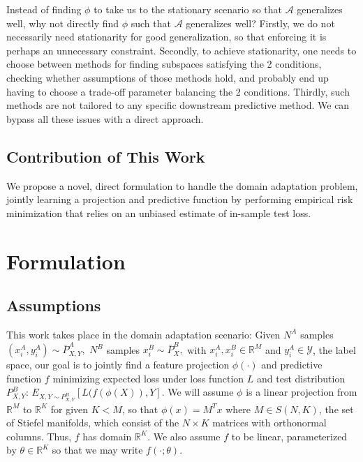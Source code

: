\documentclass[8pt]{article}
\begin{document}
Instead of finding $\phi$ to take us to the stationary scenario so that $\mathcal{A}$ generalizes well, why not directly find $\phi$ such that $\mathcal{A}$ generalizes well?  Firstly, we do not necessarily need stationarity for good generalization, so that enforcing it is perhaps an unnecessary constraint.  Secondly, to achieve stationarity, one needs to choose between methods for finding subspaces satisfying the 2 conditions, checking whether assumptions of those methods hold, and probably end up having to choose a trade-off parameter balancing the 2 conditions.  Thirdly, such methods are not tailored to any specific downstream predictive method.  We can bypass all these issues with a direct approach.%

\subsection{Contribution of This Work}
We propose a novel, direct formulation to handle the domain adaptation problem, jointly learning a projection and predictive function by performing empirical risk minimization that relies on an unbiased estimate of in-sample test loss.

\section{Formulation}
\subsection{Assumptions}
This work takes place in the domain adaptation scenario: Given $N^A$ samples $(x_i^A,y_i^A) \sim \bar{P}^A_{X,Y},$ $N^B$ samples $x_i^B \sim \bar{P}^B_{X},$ with $x_i^A,x_i^B \in \mathbb{R}^M$ and $y_i^A \in \mathcal{Y}$, the label space, our goal is to jointly find a feature projection $\phi(\cdot)$ and predictive function $f$ minimizing expected loss under loss function $L$ and test distribution $P^B_{X,Y}$: $E_{X,Y\sim P^B_{X,Y}}[L(f(\phi(X)),Y]$.  We will assume $\phi$ is a linear projection from $\mathbb{R}^M$ to $\mathbb{R}^K$ for given $K<M$, so that $\phi(x)=M^Tx$ where $M\in S(N,K)$, the set of Stiefel manifolds, which consist of the $N\times K$ matrices with orthonormal columns.  Thus, $f$ has domain $\mathbb{R}^K$.  We also assume $f$ to be linear, parameterized by $\theta \in \mathbb{R}^K$ so that we may write $f(\cdot;\theta)$.
\end{document}
